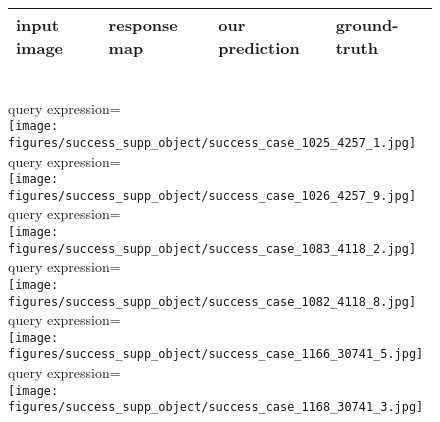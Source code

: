 \documentclass[runningheads]{llncs}
\begin{document}
\begin{figure}[t]
\centering
\begin{tabularx}{0.95\linewidth}{YYYY}
input image & response map & our prediction & ground-truth \\ \hline
\end{tabularx} \\
\small{query expression=} \\
\texttt{[image: figures/success\_supp\_object/success\_case\_1025\_4257\_1.jpg]} \\
\small{query expression=} \\
\texttt{[image: figures/success\_supp\_object/success\_case\_1026\_4257\_9.jpg]} \\
\small{query expression=} \\
\texttt{[image: figures/success\_supp\_object/success\_case\_1083\_4118\_2.jpg]} \\
\small{query expression=} \\
\texttt{[image: figures/success\_supp\_object/success\_case\_1082\_4118\_8.jpg]} \\
\small{query expression=} \\
\texttt{[image: figures/success\_supp\_object/success\_case\_1166\_30741\_5.jpg]} \\
\small{query expression=} \\
\texttt{[image: figures/success\_supp\_object/success\_case\_1168\_30741\_3.jpg]} \\
\end{figure}
\end{document}
